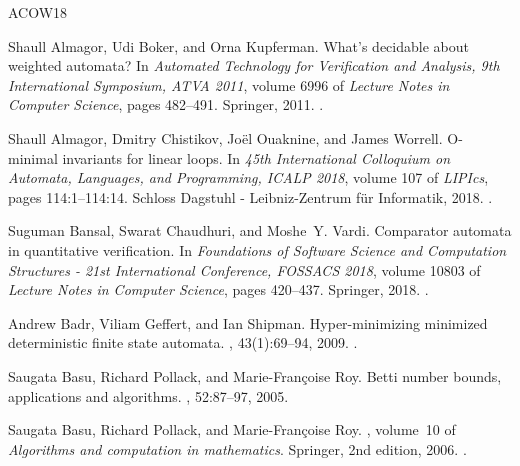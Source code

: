 \documentclass[10pt,a4paper]{amsart}
\numberwithin{equation}{section}
\theoremstyle{plain}
\theoremstyle{definition}
\theoremstyle{remark}
\begin{document}
\newcommand{\etalchar}[1]{$^{#1}$}
\begin{thebibliography}{ACOW18}

Shaull Almagor, Udi Boker, and Orna Kupferman.
\newblock What's decidable about weighted automata?
\newblock In {\em Automated Technology for Verification and Analysis, 9th
  International Symposium, {ATVA} 2011}, volume 6996 of {\em Lecture Notes in
  Computer Science}, pages 482--491. Springer, 2011.
\newblock \href {https://doi.org/10.1007/978-3-642-24372-1_37}
  {}.

Shaull Almagor, Dmitry Chistikov, Jo{\"{e}}l Ouaknine, and James Worrell.
\newblock O-minimal invariants for linear loops.
\newblock In {\em 45th International Colloquium on Automata, Languages, and
  Programming, {ICALP} 2018}, volume 107 of {\em LIPIcs}, pages 114:1--114:14.
  Schloss Dagstuhl - Leibniz-Zentrum f{\"{u}}r Informatik, 2018.
\newblock \href {https://doi.org/10.4230/LIPIcs.ICALP.2018.114}
  {}.

Suguman Bansal, Swarat Chaudhuri, and Moshe~Y. Vardi.
\newblock Comparator automata in quantitative verification.
\newblock In {\em Foundations of Software Science and Computation Structures -
  21st International Conference, {FOSSACS} 2018}, volume 10803 of {\em Lecture
  Notes in Computer Science}, pages 420--437. Springer, 2018.
\newblock \href {https://doi.org/10.1007/978-3-319-89366-2_23}
  {}.

Andrew Badr, Viliam Geffert, and Ian Shipman.
\newblock Hyper-minimizing minimized deterministic finite state automata.
, 43(1):69--94, 2009.
\newblock \href {https://doi.org/10.1051/ita:2007061}
  {}.

Saugata Basu, Richard Pollack, and Marie-Fran{\c{c}}oise Roy.
\newblock Betti number bounds, applications and algorithms.
, 52:87--97, 2005.

Saugata Basu, Richard Pollack, and Marie-Fran\c{c}oise Roy.
, volume~10 of {\em
  Algorithms and computation in mathematics}.
\newblock Springer, 2nd edition, 2006.
\newblock \href {https://doi.org/10.1007/3-540-33099-2}
  {}.


\end{thebibliography}
\end{document}
